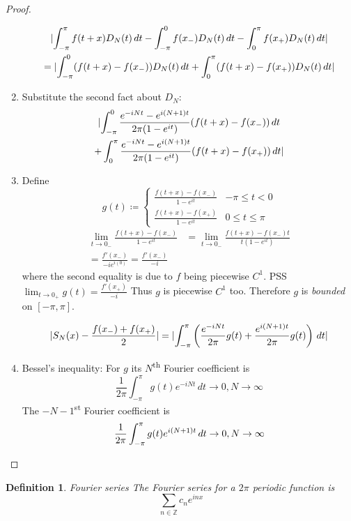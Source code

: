 \documentclass{article}
\newtheorem{definition}{Definition}
\DeclarePairedDelimiter\abs{\lvert}{\rvert}
\begin{document}
\begin{proof}
\begin{enumerate}
			\begin{multline*}
				\abs{\int_{-\pi}^\pi f(t + x) D_N(t) \, dt - \int_{-\pi}^0 f(x_-)D_N(t) \, dt - \int_0^\pi f(x_+)D_N(t) \, dt} \\
				= \abs{\int_{-\pi}^0 (f(t + x) - f(x_-)) D_N(t) \, dt + \int_0^\pi (f(t + x) - f(x_+)) D_N(t) \, dt}
			\end{multline*}

		\item Substitute the second fact about $D_N$:
			\begin{multline*}
				\abs{\int_{-\pi}^0 \frac{e^{-iNt} - e^{i(N + 1)t}}{2\pi (1 - e^{it})} (f(t + x) - f(x_-)) \, dt \\
				+ \int_0^\pi \frac{e^{-iNt} - e^{i(N + 1)t}}{2\pi (1 - e^{it})} (f(t + x) - f(x_+)) \, dt}
			\end{multline*}

		\item Define
			$$ g(t) \coloneqq \begin{cases}
				\frac{f(t + x) - f(x_-)}{1 - e^{it}} & -\pi \le t < 0 \\
				\frac{f(t + x) - f(x_+)}{1 - e^{it}} & 0 \le t \le \pi
			\end{cases} $$
			\begin{align*}
				\lim_{t \to 0_-} \frac{f(t + x) - f(x_-)}{1 - e^{it}} &= \lim_{t \to 0_-} \frac{f(t + x) - f(x_-) t}{t (1 - e^{it})} \\
				= \frac{f'(x_-)}{-i e^{i(0)}} = \frac{f'(x_-)}{-i}
			\end{align*}
			where the second equality is due to $f$ being piecewise $C^1$.
			PSS $\lim_{t \to 0_+} g(t) = \frac{f'(x_+)}{-i}$
			Thus $g$ is piecewise $C^1$ too. Therefore $g$ is \emph{bounded} on $[-\pi, \pi]$.

			$$ \abs{S_N(x) - \frac{f(x_-) + f(x_+)}2}
			= \abs{\int_{-\pi}^\pi \left(\frac{e^{-iNt}}{2\pi} g(t) + \frac{e^{i(N + 1)t}}{2\pi} g(t) \right) \, dt} $$

		\item Bessel's inequality: For $g$ its $N$\textsuperscript{th} Fourier coefficient is
			$$ \frac1{2\pi} \int_{-\pi}^\pi g(t) e^{-iNt} \, dt \to 0, N \to \infty $$
			The $-N-1$\textsuperscript{st} Fourier coefficient is
			$$ \frac1{2\pi} \int_{-\pi}^\pi g(t) e^{i(N + 1)t} \, dt \to 0, N \to \infty \qedhere $$
	\end{enumerate}
\end{proof}

\begin{definition}{Fourier series}
	The Fourier series for a $2\pi$ periodic function is
	$$ \sum_{n \in \mathbb Z} c_n e^{inx} $$
\end{definition}
\end{document}
